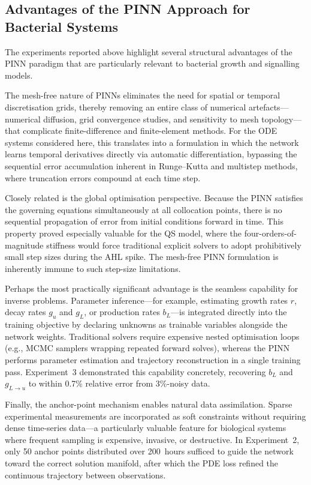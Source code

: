 \documentclass[14pt,a4paper,openany]{extbook}
\begin{document}
\subsection{Advantages of the PINN Approach for Bacterial Systems}
\label{subsec:advantages}

The experiments reported above highlight several structural advantages of the PINN paradigm that are particularly relevant to bacterial growth and signalling models.

The mesh-free nature of PINNs eliminates the need for spatial or temporal discretisation grids, thereby removing an entire class of numerical artefacts---numerical diffusion, grid convergence studies, and sensitivity to mesh topology---that complicate finite-difference and finite-element methods. For the ODE systems considered here, this translates into a formulation in which the network learns temporal derivatives directly via automatic differentiation, bypassing the sequential error accumulation inherent in Runge--Kutta and multistep methods, where truncation errors compound at each time step.

Closely related is the global optimisation perspective. Because the PINN satisfies the governing equations simultaneously at all collocation points, there is no sequential propagation of error from initial conditions forward in time. This property proved especially valuable for the QS model, where the four-orders-of-magnitude stiffness would force traditional explicit solvers to adopt prohibitively small step sizes during the AHL spike. The mesh-free PINN formulation is inherently immune to such step-size limitations.

Perhaps the most practically significant advantage is the seamless capability for inverse problems. Parameter inference---for example, estimating growth rates $r$, decay rates $g_u$ and $g_L$, or production rates $b_L$---is integrated directly into the training objective by declaring unknowns as trainable variables alongside the network weights. Traditional solvers require expensive nested optimisation loops (e.g., MCMC samplers wrapping repeated forward solves), whereas the PINN performs parameter estimation and trajectory reconstruction in a single training pass. Experiment~3 demonstrated this capability concretely, recovering $b_L$ and $g_{L \to u}$ to within 0.7\% relative error from 3\%-noisy data.

Finally, the anchor-point mechanism enables natural data assimilation. Sparse experimental measurements are incorporated as soft constraints without requiring dense time-series data---a particularly valuable feature for biological systems where frequent sampling is expensive, invasive, or destructive. In Experiment~2, only 50 anchor points distributed over 200~hours sufficed to guide the network toward the correct solution manifold, after which the PDE loss refined the continuous trajectory between observations.
\end{document}
